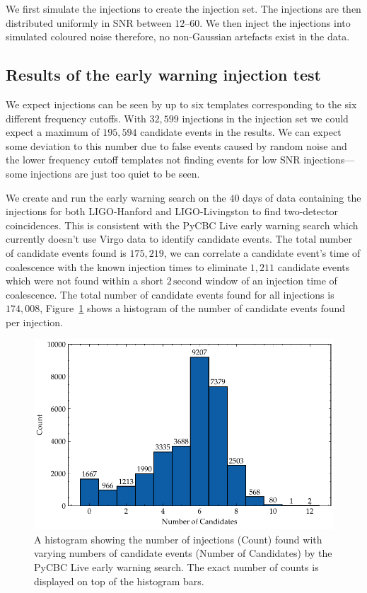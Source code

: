 We first simulate the injections to create the injection set. The injections are then distributed uniformly in SNR between $12\text{--}60$. We then inject the injections into simulated coloured noise therefore, no non-Gaussian artefacts exist in the data.

\subsection{\label{6:sec:results}Results of the early warning injection test}

We expect injections can be seen by up to six templates corresponding to the six different frequency cutoffs. With $32,599$ injections in the injection set we could expect a maximum of $195,594$ candidate events in the results. We can expect some deviation to this number due to false events caused by random noise and the lower frequency cutoff templates not finding events for low SNR injections---some injections are just too quiet to be seen.

We create and run the early warning search on the $40$ days of data containing the injections for both LIGO-Hanford and LIGO-Livingston to find two-detector coincidences. This is consistent with the PyCBC Live early warning search which currently doesn't use Virgo data to identify candidate events. The total number of candidate events found is $175,219$, we can correlate a candidate event's time of coalescence with the known injection times to eliminate $1,211$ candidate events which were not found within a short $2 \, \text{second}$ window of an injection time of coalescence. The total number of candidate events found for all injections is $174,008$, Figure~\ref{6:fig:cand_hist_dupes} shows a histogram of the number of candidate events found per injection.
%
\begin{figure}
    \centering
    \includegraphics[width=1.0\textwidth]{images/6_earlywarning/results/count_histogram_dupes.pdf}
    \caption{A histogram showing the number of injections (Count) found with varying numbers of candidate events (Number of Candidates) by the PyCBC Live early warning search. The exact number of counts is displayed on top of the histogram bars.}
    \label{6:fig:cand_hist_dupes}
\end{figure}
%

